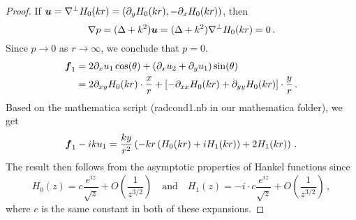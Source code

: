 \begin{proof}
If ${\boldsymbol u} = \nabla^{\perp} H_{0}(k r) = (\partial_{y} H_{0}(k r), 
-\partial_{x} H_{0}(k r))$, then
\begin{equation}
\nabla  p = (\Delta + k^2) {\boldsymbol u} = (\Delta + k^2) \nabla^{\perp} 
H_{0} (k r) = 0 \, .
\end{equation}
Since $p\to 0$ as $r\to \infty$, we conclude that $p=0$.
\begin{align}
{\boldsymbol f}_{1} &= 2\partial_{x} u_{1} \cos(\theta) + \left( \partial_{x} u_{2} + 
\partial_{y} u_{1} \right) \sin(\theta) \\
&= 2 \partial_{xy} H_{0}(k r) \cdot \frac{x}{r} +
\left[-\partial_{xx} H_{0}(k r) + \partial_{yy} H_{0}(k r) \right]
\cdot \frac{y}{r} \, .
\end{align}
Based on the mathematica script (radcond1.nb in our mathematica folder), we
get
\begin{equation}
{\boldsymbol f}_{1} - i k u_{1} = \frac{ky}{r^2} \left( -kr \left(H_{0}(k r) + 
i H_{1}(k r)\right) +
2 H_{1}(k r)\right) \, .
\end{equation}
The result then follows from the asymptotic properties of Hankel functions since
\begin{equation}
H_{0}(z) = c \frac{e^{iz}}{\sqrt{z}} + O(\frac{1}{z^{3/2}}) \quad 
\text{and} \quad 
H_{1}(z) = -i \cdot c \frac{e^{iz}}{\sqrt{z}} + O(\frac{1}{z^{3/2}}) \,,
\end{equation}
where $c$ is the same constant in both of these expansions.
\end{proof}
